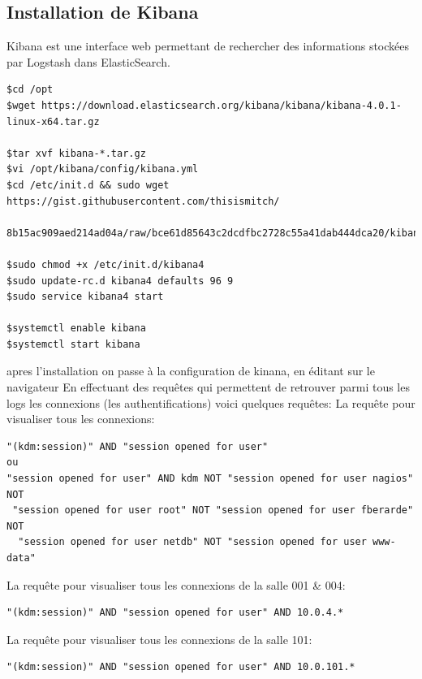 \documentclass[11pt,a4paper]{article}
\begin{document}
\subsection{Installation de Kibana}
Kibana est une interface web permettant de rechercher des informations stockées par Logstash dans ElasticSearch.

\begin{verbatim}
$cd /opt
$wget https://download.elasticsearch.org/kibana/kibana/kibana-4.0.1-linux-x64.tar.gz

$tar xvf kibana-*.tar.gz
$vi /opt/kibana/config/kibana.yml
$cd /etc/init.d && sudo wget https://gist.githubusercontent.com/thisismitch/
 8b15ac909aed214ad04a/raw/bce61d85643c2dcdfbc2728c55a41dab444dca20/kibana4

$sudo chmod +x /etc/init.d/kibana4
$sudo update-rc.d kibana4 defaults 96 9
$sudo service kibana4 start

$systemctl enable kibana
$systemctl start kibana
\end{verbatim}

apres l'installation on passe à la configuration de kinana, en éditant 
sur le navigateur 
En effectuant des requêtes qui permettent de retrouver parmi tous les logs les connexions (les authentifications) voici quelques requêtes:
La requête pour visualiser tous les connexions:
\begin{verbatim}
"(kdm:session)" AND "session opened for user"
ou
"session opened for user" AND kdm NOT "session opened for user nagios" NOT
 "session opened for user root" NOT "session opened for user fberarde" NOT
  "session opened for user netdb" NOT "session opened for user www-data"
\end{verbatim}
La requête pour visualiser tous les connexions de la salle 001 \& 004:
\begin{verbatim}
"(kdm:session)" AND "session opened for user" AND 10.0.4.*
\end{verbatim}
La requête pour visualiser tous les connexions de la salle 101:
\begin{verbatim}
"(kdm:session)" AND "session opened for user" AND 10.0.101.*
\end{verbatim}
\end{document}
